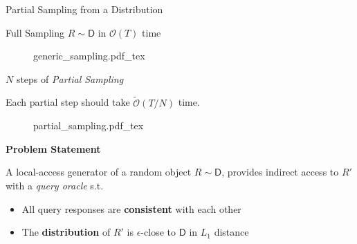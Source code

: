 \begin{block}{Partial Sampling from a Distribution}


\begin{alertblock}{Full Sampling $R \sim\mathsf D$ in $\mathcal O (T)$ time}

\begin{figure}[h!]\centering
    \def\svgwidth{0.5\columnwidth}
    {generic_sampling.pdf_tex}
\end{figure}

\end{alertblock}


\begin{alertblock}{$N$ steps of \emph{Partial Sampling}}

\begin{center}
Each partial step should take $\tilde{\mathcal O} (T/N)$ time.
\end{center}

\begin{figure}[h!]\centering
    \def\svgwidth{0.7\columnwidth}
    {partial_sampling.pdf_tex}
\end{figure}

\end{alertblock}



\begin{alertblock}{\textbf{Problem Statement}}

A local-access generator of a random object $R \sim\mathsf D$,
provides indirect access to $R'$ with a \emph{query oracle} s.t.
\begin{itemize}
    \item All query responses are \textbf{consistent} with each other
    \item The \textbf{distribution} of $R'$ is $\epsilon$-close to $\mathsf D$ in $L_1$ distance
\end{itemize}

\end{alertblock}

\end{block}

